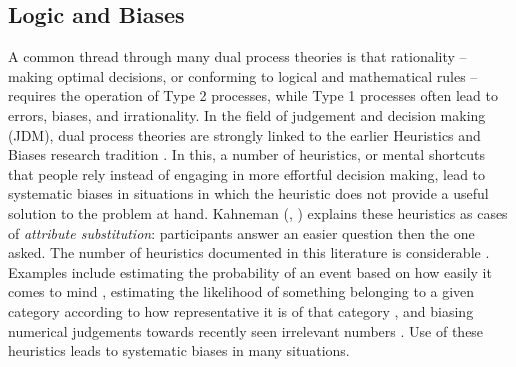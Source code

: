 \subsection{Logic and Biases}
\label{subsec:chapter1-dual-process-logic-and-biases}

A common thread through many dual process theories is that rationality --
making optimal decisions, or conforming to logical and mathematical rules --
requires the operation of Type 2 processes,
while Type 1 processes often lead to errors, biases, and irrationality.
In the field of judgement and decision making (JDM),
dual process theories are strongly linked
to the earlier Heuristics and Biases research tradition
\citep{Gilovich2002,Tversky1974,Kahneman1982}. %
In this, a number of heuristics, or mental shortcuts
that people rely instead of engaging in more effortful decision making,
lead to systematic biases in situations in which
the heuristic does not provide a useful solution
to the problem at hand.
Kahneman (\citeyear{Kahneman2011}, \citealp{Kahneman2002})
explains these heuristics as cases of \emph{attribute substitution}:
participants answer an easier question then the one asked.
The number of heuristics documented in this literature is considerable
\citep[see][for reviews]{Gilovich2002}.
Examples include estimating the probability of an event
based on how easily it comes to mind
\citep[the availability heuristic;][]{Tversky1973},
estimating the likelihood of something belonging to a given category
according to how representative it is of that category
\citep[the representativeness heuristic;][]{Kahneman1973,Kahneman1972},
and biasing numerical judgements towards
recently seen irrelevant numbers 
\citep[anchoring and adjustment;][]{Tversky1974}.
Use of these heuristics leads to systematic biases
in many situations.

